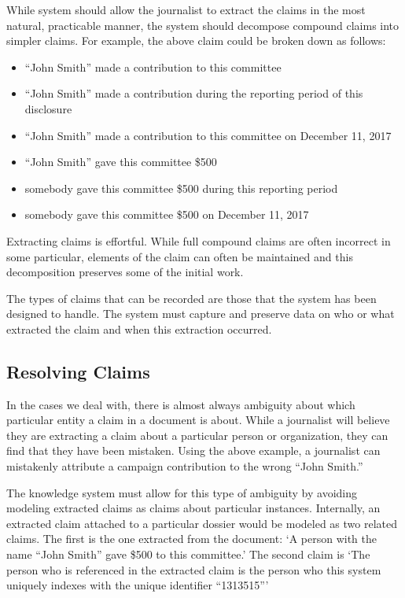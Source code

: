 \documentclass[format=siggraph, review=true]{acmart}
\begin{document}
While system should allow the journalist to extract the claims in the
most natural, practicable manner, the system should decompose compound
claims into simpler claims. For example, the above
claim could be broken down as follows:

\begin{itemize}
\item ``John Smith'' made a contribution to this committee
\item ``John Smith'' made a contribution during the reporting period of this disclosure
\item ``John Smith'' made a contribution to this committee on December 11, 2017
\item ``John Smith'' gave this committee \$500
\item somebody gave this committee \$500 during this reporting period
\item somebody gave this committee \$500 on December 11, 2017
\end{itemize}

Extracting claims is effortful. While full compound claims are often
incorrect in some particular, elements of the claim can often be
maintained and this decomposition preserves some of the initial work.

The types of claims that can be recorded are those that the system has
been designed to handle. The system must capture and preserve data on
who or what extracted the claim and when this extraction occurred.

\subsection{Resolving Claims}
In the cases we deal with, there is almost always ambiguity about
which particular entity a claim in a document is about. While a
journalist will believe they are extracting a claim about a particular
person or organization, they can find that they have been
mistaken. Using the above example, a journalist can mistakenly
attribute a campaign contribution to the wrong ``John Smith.''

The knowledge system must allow for this type of ambiguity by avoiding
modeling extracted claims as claims about particular
instances. Internally, an extracted claim attached to a particular
dossier would be modeled as two related claims. The first is the one
extracted from the document: `A person with the name ``John Smith''
gave \$500 to this committee.' The second claim is `The person who is
referenced in the extracted claim is the person who this system
uniquely indexes with the unique identifier ``1313515'''
\end{document}
